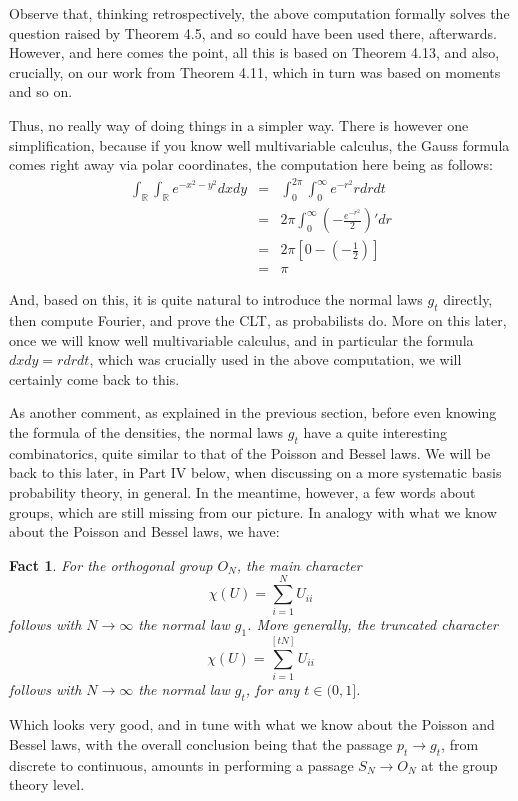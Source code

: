 \documentclass[12pt]{amsbook}
\newtheorem{fact}[theorem]{Fact}
\begin{document}
Observe that, thinking retrospectively, the above computation formally solves the question raised by Theorem 4.5, and so could have been used there, afterwards. However, and here comes the point, all this is based on Theorem 4.13, and also, crucially, on our work from Theorem 4.11, which in turn was based on moments and so on.

\bigskip

Thus, no really way of doing things in a simpler way. There is however one simplification, because if you know well multivariable calculus, the Gauss formula comes right away via polar coordinates, the computation here being as follows:
\begin{eqnarray*}
\int_\mathbb R\int_\mathbb Re^{-x^2-y^2}dxdy
&=&\int_0^{2\pi}\int_0^\infty e^{-r^2}rdrdt\\
&=&2\pi\int_0^\infty\left(-\frac{e^{-r^2}}{2}\right)'dr\\
&=&2\pi\left[0-\left(-\frac{1}{2}\right)\right]\\
&=&\pi
\end{eqnarray*}

And, based on this, it is quite natural to introduce the normal laws $g_t$ directly, then compute Fourier, and prove the CLT, as probabilists do. More on this later, once we will know well multivariable calculus, and in particular the formula $dxdy=rdrdt$, which was crucially used in the above computation, we will certainly come back to this. 

\bigskip

As another comment, as explained in the previous section, before even knowing the formula of the densities, the normal laws $g_t$ have a quite interesting combinatorics, quite similar to that of the Poisson and Bessel laws. We will be back to this later, in Part IV below, when discussing on a more systematic basis probability theory, in general. In the meantime, however, a few words about groups, which are still missing from our picture. In analogy with what we know about the Poisson and Bessel laws, we have:

\begin{fact}
For the orthogonal group $O_N$, the main character
$$\chi(U)=\sum_{i=1}^NU_{ii}$$
follows with $N\to\infty$ the normal law $g_1$. More generally, the truncated character
$$\chi(U)=\sum_{i=1}^{[tN]}U_{ii}$$
follows with $N\to\infty$ the normal law $g_t$, for any $t\in(0,1]$. 
\end{fact}

Which looks very good, and in tune with what we know about the Poisson and Bessel laws, with the overall conclusion being that the passage $p_t\to g_t$, from discrete to continuous, amounts in performing a passage $S_N\to O_N$ at the group theory level. 
\end{document}
